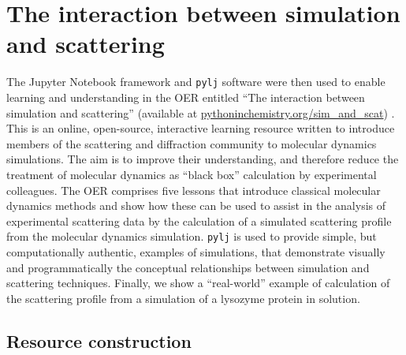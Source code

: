 \section{The interaction between simulation and scattering}
\label{sec:sim_and_scat}

The Jupyter Notebook framework and \texttt{pylj} software were then used to enable learning and understanding in the OER entitled ``The interaction between simulation and scattering'' (available at \href{https://pythoninchemistry.org/sim_and_scat}{pythoninchemistry.org/sim\_and\_scat}) \cite{mccluskey_pythoninchemistry/sim_and_scat_2019}.
This is an online, open-source, interactive learning resource written to introduce members of the scattering and diffraction community to molecular dynamics simulations.
The aim is to improve their understanding, and therefore reduce the treatment of molecular dynamics as ``black box'' calculation by experimental colleagues.
The OER comprises five lessons that introduce classical molecular dynamics methods and show how these can be used to assist in the analysis of experimental scattering data by the calculation of a simulated scattering profile from the molecular dynamics simulation.
\texttt{pylj} is used to provide simple, but computationally authentic, examples of simulations, that demonstrate visually and programmatically the conceptual relationships between simulation and scattering techniques.
Finally, we show a ``real-world'' example of calculation of the scattering profile from a simulation of a lysozyme protein in solution.

\subsection{Resource construction}


